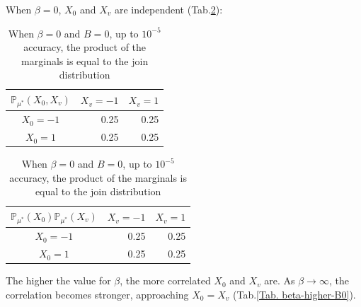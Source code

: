 \documentclass[12pt]{article}
\numberwithin{equation}{section}
\begin{document}
When $\beta=0$, $X_0$ and $X_v$ are independent (Tab.\ref{Tab. beta0B0}):
\begin{table}[h]
    \centering
    \begin{tabular}{c|rr}
        $\mathbb{P}_{\mu^*}(X_0, X_v)$ & \multicolumn{1}{c}{$X_v=-1$} & \multicolumn{1}{c}{$X_v=1$} \\ \hline
        $X_0=-1$                       & 0.25                         & 0.25                        \\
        $X_0=1$                        & 0.25                         & 0.25
    \end{tabular}
    \quad\quad
    \begin{tabular}{c|rr}
        $\mathbb{P}_{\mu^*}(X_0)\mathbb{P}_{\mu^*}(X_v)$ & \multicolumn{1}{c}{$X_v=-1$} & \multicolumn{1}{c}{$X_v=1$} \\ \hline
        $X_0=-1$                                         & 0.25                         & 0.25                        \\
        $X_0=1$                                          & 0.25                         & 0.25
    \end{tabular}
    \caption{When $\beta=0$ and $B=0$, up to $10^{-5}$ accuracy, the product of the marginals is equal to the join distribution}
    \label{Tab. beta0B0}
\end{table}

\noindent The higher the value for $\beta$, the more correlated $X_0$ and $X_v$ are. As $\beta\rightarrow\infty$, the correlation becomes stronger,
approaching $X_0=X_v$ (Tab.\ref{Tab. beta-higher-B0}).
\end{document}
